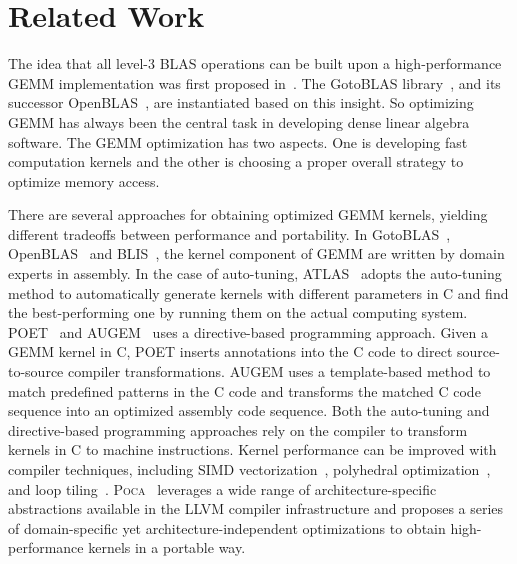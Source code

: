\section{Related Work}\label{sec:related}
The idea that all level-3 BLAS operations can be built upon
a high-performance GEMM implementation was first proposed
in~\cite{gemmbased1,gemmbased2}.
The GotoBLAS library~\cite{gotoblas}, and its successor OpenBLAS~\cite{openblas},
are instantiated based on this insight.
So optimizing GEMM has always been the central task in developing
dense linear algebra software.
The GEMM optimization has two aspects.
One is developing fast computation kernels and
the other is choosing a proper overall strategy
to optimize memory access.


There are several approaches for obtaining optimized GEMM kernels,
yielding different tradeoffs between performance and portability.
In GotoBLAS~\cite{gotoblas}, OpenBLAS~\cite{openblas} and BLIS~\cite{blis},
the kernel component of GEMM are written by domain experts in assembly.
In the case of auto-tuning,
ATLAS~\cite{atlas} adopts the auto-tuning method to
automatically generate kernels with different parameters
in C and find the best-performing one by running them
on the actual computing system.
POET~\cite{poet,poetcgo,poetmicro} and AUGEM~\cite{augem} uses a 
directive-based programming approach.
Given a GEMM kernel in C, POET inserts annotations into
the C code to direct source-to-source compiler transformations.
AUGEM uses a template-based method to match
predefined patterns in the C code and transforms the matched
C code sequence into an optimized assembly code sequence.
Both the auto-tuning and directive-based programming approaches
rely on the compiler to transform kernels in C to machine instructions.
Kernel performance can be improved with compiler techniques,
including SIMD vectorization~\cite{Larsen:2000,Zhou:2016,Zhou:2016b,
  Eichenberger2004,GCCSLP2007},
polyhedral optimization~\cite{Bondhugula2008A,Kong:2013}, 
and loop tiling~\cite{Lam1991,Spampinato:2014,Xue00}.
\textsc{Poca}~\cite{poca} leverages a wide range of architecture-specific
abstractions available in the LLVM compiler infrastructure
and proposes a series of domain-specific yet architecture-independent optimizations
to obtain high-performance kernels in a portable way.

